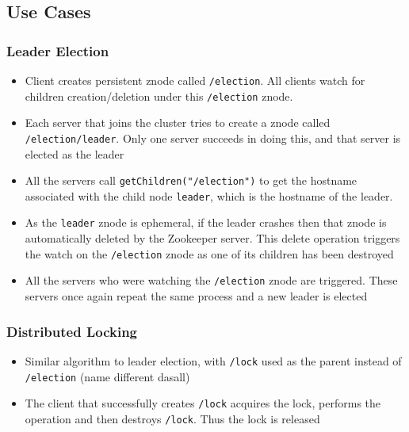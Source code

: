 \documentclass{article}
\begin{document}
\subsection{Use Cases}
\subsubsection{Leader Election}
\begin{itemize}
    \item Client creates persistent znode called \texttt{/election}. All clients watch for children creation/deletion under this \texttt{/election} znode.
    
    \item Each server that joins the cluster tries to create a znode called \texttt{/election/leader}. Only one server succeeds in doing this, and that server is elected as the leader
    
    \item All the servers call \texttt{getChildren("/election")} to get the hostname associated with the child node \texttt{leader}, which is the hostname of the leader.
    
    \item As the \texttt{leader} znode is ephemeral, if the leader crashes then that znode is automatically deleted by the Zookeeper server. This delete operation triggers the watch on the \texttt{/election} znode as one of its children has been destroyed
    
    \item All the servers who were watching the \texttt{/election} znode are triggered. These servers once again repeat the same process and a new leader is elected
\end{itemize}

\subsubsection{Distributed Locking}
\begin{itemize}
    \item Similar algorithm to leader election, with \texttt{/lock} used as the parent instead of \texttt{/election} (name different dasall)
    
    \item The client that successfully creates \texttt{/lock} acquires the lock, performs the operation and then destroys \texttt{/lock}. Thus the lock is released
\end{itemize}
\end{document}
